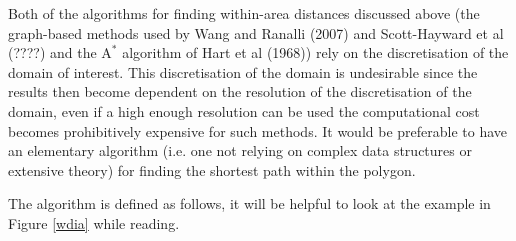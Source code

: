 \documentclass[useAMS, referee]{biom}
\begin{document}
Both of the algorithms for finding within-area distances discussed above (the graph-based methods used by Wang and Ranalli (2007) and Scott-Hayward et al (????) and the $\text{A}^*$ algorithm of Hart et al (1968)) rely on the discretisation of the domain of interest. This discretisation of the domain is undesirable since the results then become dependent on the resolution of the discretisation of the domain, even if a high enough resolution can be used the computational cost becomes prohibitively expensive for such methods. It would be preferable to have an elementary algorithm (i.e. one not relying on complex data structures or extensive theory) for finding the shortest path within the polygon.

The algorithm is defined as follows, it will be helpful to look at the example in Figure \ref{wdia} while reading.
\end{document}
